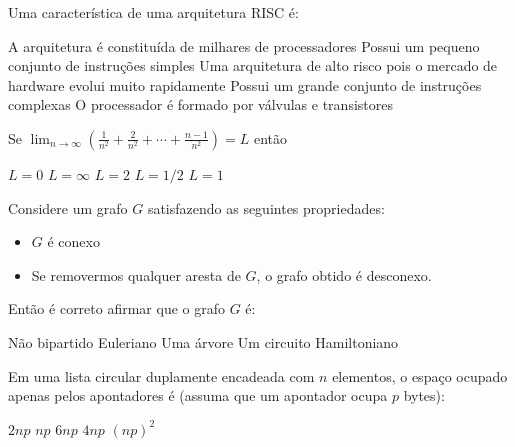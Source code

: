 \documentclass[12pt, addpoints]{exam}
\begin{document}
    \begin{questions}

    \newpage
    \question

Uma característica de uma arquitetura RISC é:
\begin{choices}
\choice A arquitetura é constituída de milhares de processadores
\choice Possui um pequeno conjunto de instruções simples
\choice Uma arquitetura de alto risco pois o mercado de hardware evolui muito rapidamente
\choice Possui um grande conjunto de instruções complexas
\choice O processador é formado por válvulas e transistores
\end{choices}

\question

Se \( \lim_{n \to \infty} \left( \frac{1}{n^2} + \frac{2}{n^2} + \cdots + \frac{n-1}{n^2} \right) = L \) então


\begin{choices}
\choice \( L = 0 \)
\choice \( L = \infty \)
\choice \( L = 2 \)
\choice \( L = 1/2 \)
\choice \( L = 1 \)
\end{choices}

\question

Considere um grafo \( G \) satisfazendo as seguintes propriedades:



\begin{itemize}

    \item \( G \) é conexo

    \item Se removermos qualquer aresta de \( G \), o grafo obtido é desconexo.

\end{itemize}



Então é correto afirmar que o grafo \( G \) é:
\begin{choices}
\choice Não bipartido
\choice Euleriano
\choice Uma árvore
\choice Um circuito
\choice Hamiltoniano
\end{choices}

\question

Em uma lista circular duplamente encadeada com \( n \) elementos, o espaço ocupado apenas pelos apontadores é (assuma que um apontador ocupa \( p \) bytes):
\begin{choices}
\choice \( 2np \)
\choice \( np \)
\choice \( 6np \)
\choice \( 4np \)
\choice \( (np)^2 \)
\end{choices}


\end{questions}
\end{document}
